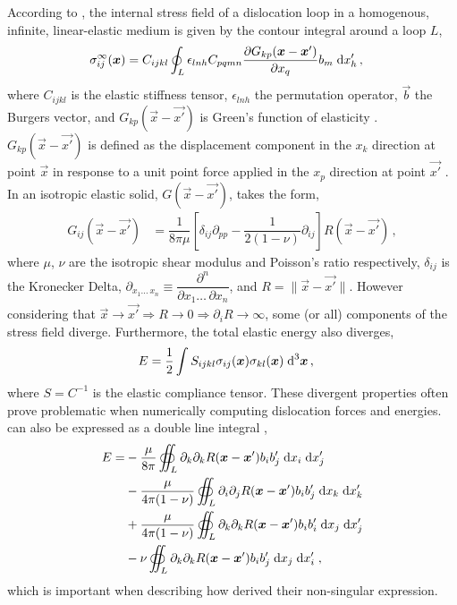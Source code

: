 According to \cite{mura_t}, the internal stress field of a dislocation loop in a homogenous, infinite, linear-elastic medium is given by the contour integral around a loop $ L $,
\begin{align}\label{eq:field_stress}
	\sigma_{ij}^{\infty}(\vec{x}) & = C_{ijkl} \oint_{L} \epsilon_{lnh} C_{pqmn} \dfrac{\partial G_{kp}(\vec{x} - \vec{x'})}{\partial x_{q}} b_{m}\; \rvar{d}x'_{h}\,,
\end{align}
where $ C_{ijkl} $ is the elastic stiffness tensor, $ \epsilon_{lnh} $ the permutation operator, $ \vec{b} $ the Burgers vector, and $ G_{kp}(\vec{x} - \vec{x'}) $ is Green's function of elasticity \cite{mura_t}. $ G_{kp}(\vec{x} - \vec{x'}) $ is defined as the displacement component in the $ x_{k} $ direction at point $ \vec{x} $ in response to a unit point force applied in the $ x_{p} $ direction at point $ \vec{x'} $ \cite{a_non-singular_continuum_theory_of_dislocations}. In an isotropic elastic solid, $ G(\vec{x} - \vec{x'}) $, takes the form,
\begin{align}\label{eq:elastic_green_func}
	G_{ij}(\vec{x} - \vec{x'}) & = \dfrac{1}{8\pi \mu}\left[ \delta_{ij} \partial_{pp} - \dfrac{1}{2(1-\nu)} \partial_{ij} \right] R(\vec{x} - \vec{x'})\,,
\end{align}
where $ \mu $, $ \nu $ are the isotropic shear modulus and Poisson's ratio respectively, $ \delta_{ij} $ is the Kronecker Delta, $ \partial_{x_{1} \ldots\, x_{n}} \equiv \dfrac{\partial^{n}}{\partial x_{1} \ldots\, \partial x_{n}}$, and $ R = \lVert \vec{x} - \vec{x'} \rVert $. However considering that $ \vec{x} \to \vec{x'} \Rightarrow R \to 0 \Rightarrow \partial_{i} R \to \infty $, some (or all) components of the stress field diverge. Furthermore, the total elastic energy also diverges,
\begin{align}\label{eq:e_dln1}
	E & = \dfrac{1}{2} \int S_{ijkl} \sigma_{ij}(\vec{x}) \sigma_{kl}(\vec{x})\; \rvar{d}^{3}\vec{x}\,,
\end{align}
where $ S = C^{-1} $ is the elastic compliance tensor. These divergent properties often prove problematic when numerically computing dislocation forces and energies.  can also be expressed as a double line integral \cite{dewit1, dewit2},
\begin{align}\label{eq:e_dln2}
	E = & - \dfrac{\mu}{8\pi} \oiint_{L} \partial_{k} \partial_{k} R(\vec{x}-\vec{x}') b_{i} b'_{j} \;\rvar{d}x_{i} \;\rvar{d}x'_{j}\nn
	    & - \dfrac{\mu}{4 \pi (1-\nu)} \oiint_{L} \partial_{i} \partial_{j} R(\vec{x}-\vec{x}') b_{i} b'_{j} \;\rvar{d}x_{k} \;\rvar{d}x'_{k}\nn
	    & + \dfrac{\mu}{4 \pi (1-\nu)} \oiint_{L} \partial_{k} \partial_{k} R(\vec{x}-\vec{x}') b_{i} b'_{i} \;\rvar{d}x_{j} \;\rvar{d}x'_{j}\nn
	    & - \nu \oiint_{L} \partial_{k} \partial_{k} R(\vec{x}-\vec{x}') b_{i} b'_{j} \;\rvar{d}x_{j} \;\rvar{d}x'_{i}\;,
\end{align}
which is important when describing how \citet{a_non-singular_continuum_theory_of_dislocations} derived their non-singular expression.

